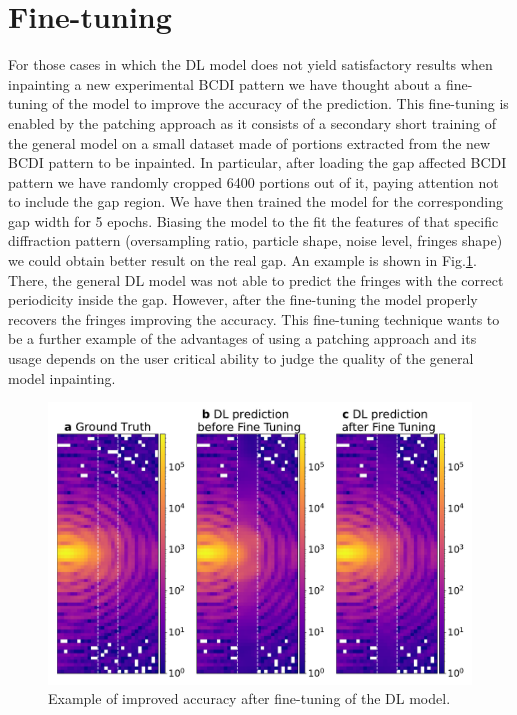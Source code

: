 \section{Fine-tuning}\label{sec:finetuning}
For those cases in which the DL model does not yield satisfactory results when inpainting a new experimental BCDI pattern 
we have thought about a fine-tuning of the model to improve the accuracy of the prediction. This fine-tuning is enabled by the 
patching approach as it consists of a secondary short training of the general model on a small dataset made of portions 
extracted from the new BCDI pattern to be inpainted.
In particular, after loading the gap affected BCDI pattern we have randomly cropped 6400 portions out of it, paying attention
not to include the gap region. We have then trained the model for the corresponding gap width for 5 epochs. Biasing the
model to the fit the features of that specific diffraction pattern (oversampling ratio, particle shape, noise level, fringes shape)
we could obtain better result on the real gap. An example is shown in Fig.\ref{sec:finetuning}. There, the general DL model
was not able to predict the fringes with the correct periodicity inside the gap. However, after the fine-tuning the model 
properly recovers the fringes improving the accuracy. 
This fine-tuning technique wants to be a further example of the advantages of using a patching approach and its usage depends
on the user critical ability to judge the quality of the general model inpainting. 

\begin{figure}[ht]
    \centering
    \includegraphics[width=\textwidth]{figures/Inpainting/FineTuning.pdf}
    \caption{Example of improved accuracy after fine-tuning of the DL model.}
    \label{fig:fine_tuning}
\end{figure}